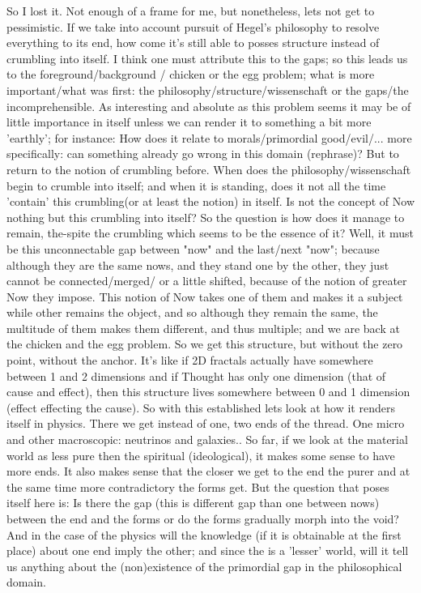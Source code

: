 \documentclass[10pt]{book}
\begin{document}
So I lost it. Not enough of a frame for me, but nonetheless, lets not get to pessimistic. If we take into account pursuit of Hegel's philosophy to resolve everything to its end, how come it's still able to posses structure instead of crumbling into itself. I think one must attribute this to the gaps; so this leads us to the foreground/background / chicken or the egg problem; what is more important/what was first: the philosophy/structure/wissenschaft or the gaps/the incomprehensible.
As interesting and absolute as this problem seems it may be of little importance in itself unless we can render it to something a bit more 'earthly'; for instance: How does it relate to morals/primordial good/evil/... more specifically: can something already go wrong in this domain (rephrase)?
But to return to the notion of crumbling before. When does the philosophy/wissenschaft begin to crumble into itself; and when it is standing, does it not all the time 'contain' this crumbling(or at least the notion) in itself. Is not the concept of Now nothing but this crumbling into itself? So the question is how does it manage to remain, the-spite the crumbling which seems to be the essence of it? Well, it must be this unconnectable gap between "now" and the last/next "now"; because although they are the same nows, and they stand one by the other, they just cannot be connected/merged/ or a little shifted, because of the notion of greater Now they impose. This notion of Now takes one of them and makes it a subject while other remains the object, and so although they remain the same, the multitude of them makes them different, and thus multiple; and we are back at the chicken and the egg problem. So we get this structure, but without the zero point, without the anchor. It's like if 2D fractals actually have somewhere between 1 and 2 dimensions and if Thought has only one dimension (that of cause and effect), then this structure lives somewhere between 0 and 1 dimension (effect effecting the cause). 
So with this established lets look at how it renders itself in physics. There we get instead of one, two ends of the thread. One micro and other macroscopic: neutrinos and galaxies.. So far, if we look at the material world as less pure then the spiritual (ideological), it makes some sense to have more ends. It also makes sense that the closer we get to the end the purer and at the same time more contradictory the forms get. But the question that poses itself here is: Is there the gap (this is different gap than one between nows) between the end and the forms or do the forms gradually morph into the void? And in the case of the physics will the knowledge (if it is obtainable at the first place) about one end imply the other; and since the is a 'lesser' world, will it tell us anything about the (non)existence of the primordial gap in the philosophical domain.
\end{document}
